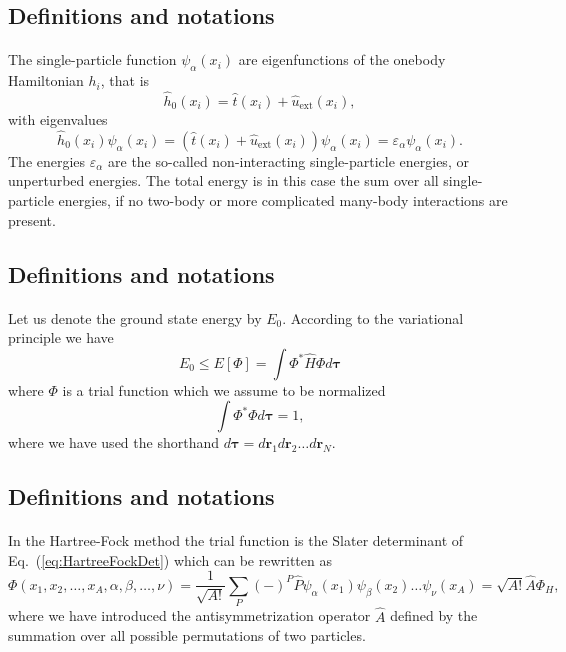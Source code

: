 \documentclass[%
twoside,                 %
final,                   %
10pt]{article}
\begin{document}
\subsection*{Definitions and notations}

\paragraph{}
The single-particle function $\psi_{\alpha}(x_i)$  are eigenfunctions of the onebody
Hamiltonian $h_i$, that is
\[
\hat{h}_0(x_i)=\hat{t}(x_i) + \hat{u}_{\mathrm{ext}}(x_i),
\]
with eigenvalues 
\[
\hat{h}_0(x_i) \psi_{\alpha}(x_i)=\left(\hat{t}(x_i) + \hat{u}_{\mathrm{ext}}(x_i)\right)\psi_{\alpha}(x_i)=\varepsilon_{\alpha}\psi_{\alpha}(x_i).
\]
The energies $\varepsilon_{\alpha}$ are the so-called non-interacting single-particle energies, or unperturbed energies. 
The total energy is in this case the sum over all  single-particle energies, if no two-body or more complicated
many-body interactions are present.



\subsection*{Definitions and notations}

\paragraph{}
Let us denote the ground state energy by $E_0$. According to the
variational principle we have
\[
  E_0 \le E[\Phi] = \int \Phi^*\hat{H}\Phi d\mathbf{\tau}
\]
where $\Phi$ is a trial function which we assume to be normalized
\[
  \int \Phi^*\Phi d\mathbf{\tau} = 1,
\]
where we have used the shorthand $d\mathbf{\tau}=d\mathbf{r}_1d\mathbf{r}_2\dots d\mathbf{r}_N$.



\subsection*{Definitions and notations}

\paragraph{}
In the Hartree-Fock method the trial function is the Slater
determinant of Eq.~(\ref{eq:HartreeFockDet}) which can be rewritten as 
\[
  \Phi(x_1,x_2,\dots,x_A,\alpha,\beta,\dots,\nu) = \frac{1}{\sqrt{A!}}\sum_{P} (-)^P\hat{P}\psi_{\alpha}(x_1)
    \psi_{\beta}(x_2)\dots\psi_{\nu}(x_A)=\sqrt{A!}\hat{A}\Phi_H,
\]
where we have introduced the antisymmetrization operator $\hat{A}$ defined by the 
summation over all possible permutations of two particles.
\end{document}
